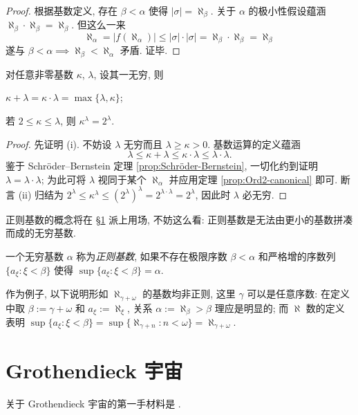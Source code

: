 \begin{proof}
	根据基数定义, 存在 $\beta < \alpha$ 使得 $|\sigma| = \aleph_\beta$. 关于 $\alpha$ 的极小性假设蕴涵 $\aleph_\beta \cdot \aleph_\beta = \aleph_\beta$. 但这么一来
	\[ \aleph_\alpha = |f(\aleph_\alpha)| \leq |\sigma| \cdot |\sigma| = \aleph_\beta \cdot \aleph_\beta = \aleph_\beta \]
	遂与 $\beta < \alpha \implies \aleph_\beta < \aleph_\alpha$ 矛盾. 证毕.
\end{proof}

\begin{corollary}\label{prop:cardinal-max}
	对任意非零基数 $\kappa$, $\lambda$, 设其一无穷, 则
	\begin{inparaenum}[(i)]
		\item $\kappa + \lambda = \kappa \cdot \lambda = \max\{\lambda, \kappa\}$;
		\item 若 $2 \leq \kappa \leq \lambda$, 则 $\kappa^\lambda = 2^\lambda$.
	\end{inparaenum}
\end{corollary}
\begin{proof}
	先证明 (i). 不妨设 $\lambda$ 无穷而且 $\lambda \geq \kappa > 0$. 基数运算的定义蕴涵
	\[ \lambda \leq \kappa + \lambda \leq \kappa \cdot \lambda \leq \lambda \cdot \lambda. \]
	鉴于 Schröder--Bernstein 定理 \ref{prop:Schröder-Bernstein}, 一切化约到证明 $\lambda = \lambda \cdot \lambda$; 为此可将 $\lambda$ 视同于某个 $\aleph_\alpha$ 并应用定理 \ref{prop:Ord2-canonical} 即可. 断言 (ii) 归结为 $2^\lambda \leq \kappa^\lambda \leq (2^{\lambda})^\lambda = 2^{\lambda \cdot \lambda} = 2^\lambda$, 因此时 $\lambda$ 必无穷.
\end{proof}

正则基数的概念将在 \S\ref{sec:Grot-universe} 派上用场, 不妨这么看: 正则基数是无法由更小的基数拼凑而成的无穷基数. 
\begin{definition}\label{def:regular-cardinal}
	一个无穷基数 $\alpha$ 称为\emph{正则基数}, 如果不存在极限序数 $\beta < \alpha$ 和严格增的序数列 $\{ a_\xi : \xi < \beta \}$ 使得 $\sup \{a_\xi : \xi < \beta\} = \alpha$.
\end{definition}

作为例子, 以下说明形如 $\aleph_{\gamma+\omega}$ 的基数均非正则, 这里 $\gamma$ 可以是任意序数: 在定义中取 $\beta := \gamma + \omega$ 和 $a_\xi := \aleph_\xi$, 关系 $\alpha := \aleph_\beta > \beta$ 理应是明显的; 而 $\aleph$ 数的定义表明 $\sup \{ a_\xi : \xi < \beta \} = \sup \{ \aleph_{\gamma + n} : n < \omega \} = \aleph_{\gamma+\omega}$.

\section{Grothendieck 宇宙}\label{sec:Grot-universe}
关于 Grothendieck 宇宙的第一手材料是 \cite[Exp.\ I, Appendice]{SGA4-1}.

